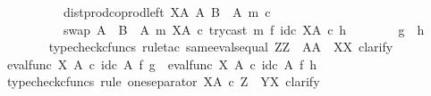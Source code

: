 \begin{isabellebody}
\ \ \ \ \ \ \ \ \ \ dist{\isacharunderscore}{\kern0pt}prod{\isacharunderscore}{\kern0pt}coprod{\isacharunderscore}{\kern0pt}left\ {\isacharparenleft}{\kern0pt}X\isactrlbsup A\isactrlesup {\isacharparenright}{\kern0pt}\ A\ {\isacharparenleft}{\kern0pt}B\ {\isasymsetminus}\ {\isacharparenleft}{\kern0pt}A{\isacharcomma}{\kern0pt}\ m{\isacharparenright}{\kern0pt}{\isacharparenright}{\kern0pt}\ {\isasymcirc}\isactrlsub c\isanewline
\ \ \ \ \ \ \ \ \ \ swap\ {\isacharparenleft}{\kern0pt}A\ {\isasymCoprod}\ {\isacharparenleft}{\kern0pt}B\ {\isasymsetminus}\ {\isacharparenleft}{\kern0pt}A{\isacharcomma}{\kern0pt}\ m{\isacharparenright}{\kern0pt}{\isacharparenright}{\kern0pt}{\isacharparenright}{\kern0pt}\ {\isacharparenleft}{\kern0pt}X\isactrlbsup A\isactrlesup {\isacharparenright}{\kern0pt}\ {\isasymcirc}\isactrlsub c\ try{\isacharunderscore}{\kern0pt}cast\ m\ {\isasymtimes}\isactrlsub f\ id\isactrlsub c\ {\isacharparenleft}{\kern0pt}X\isactrlbsup A\isactrlesup {\isacharparenright}{\kern0pt}{\isacharparenright}{\kern0pt}\isactrlsup {\isasymsharp}\ {\isasymcirc}\isactrlsub c\ h{\isachardoublequoteclose}\isanewline
\isanewline
\ \ \ \ \ \ \isamarkupfalse%
\ {\isachardoublequoteopen}g\ {\isacharequal}{\kern0pt}\ h{\isachardoublequoteclose}\isanewline
\ \ \ \ \ \ \isamarkupfalse%
\ {\isacharparenleft}{\kern0pt}typecheck{\isacharunderscore}{\kern0pt}cfuncs{\isacharcomma}{\kern0pt}\ rule{\isacharunderscore}{\kern0pt}tac\ same{\isacharunderscore}{\kern0pt}evals{\isacharunderscore}{\kern0pt}equal{\isacharbrackleft}{\kern0pt}\ Z{\isacharequal}{\kern0pt}Z{\isacharcomma}{\kern0pt}\ \ A{\isacharequal}{\kern0pt}A{\isacharcomma}{\kern0pt}\ \ X{\isacharequal}{\kern0pt}X{\isacharbrackright}{\kern0pt}{\isacharcomma}{\kern0pt}\ clarify{\isacharparenright}{\kern0pt}\isanewline
\ \ \ \ \ \ \ \ \isamarkupfalse%
\ {\isachardoublequoteopen}eval{\isacharunderscore}{\kern0pt}func\ X\ A\ {\isasymcirc}\isactrlsub c\ id\isactrlsub c\ A\ {\isasymtimes}\isactrlsub f\ g\ {\isacharequal}{\kern0pt}\ eval{\isacharunderscore}{\kern0pt}func\ X\ A\ {\isasymcirc}\isactrlsub c\ id\isactrlsub c\ A\ {\isasymtimes}\isactrlsub f\ h{\isachardoublequoteclose}\isanewline
\ \ \ \ \ \ \ \ \isamarkupfalse%
\ {\isacharparenleft}{\kern0pt}typecheck{\isacharunderscore}{\kern0pt}cfuncs{\isacharcomma}{\kern0pt}\ rule\ one{\isacharunderscore}{\kern0pt}separator{\isacharbrackleft}{\kern0pt}\ X{\isacharequal}{\kern0pt}{\isachardoublequoteopen}A\ {\isasymtimes}\isactrlsub c\ Z{\isachardoublequoteclose}{\isacharcomma}{\kern0pt}\ \ Y{\isacharequal}{\kern0pt}{\isachardoublequoteopen}X{\isachardoublequoteclose}{\isacharbrackright}{\kern0pt}{\isacharcomma}{\kern0pt}\ clarify{\isacharparenright}{\kern0pt}\isanewline

\end{isabellebody}
